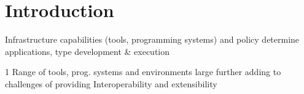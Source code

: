 \documentclass[conference,final]{IEEEtran}
\newcommand{\up}{\vspace*{-1em}}
\newcommand{\alnote}[1]{ {\textcolor{blue} { ***AL: #1 }}}
\newcommand{\jhanote}[1]{ {\textcolor{red} { ***SJ: #1 }}}
\newcommand{\alnote}[1]{}
\newcommand{\jhanote}[1]{}
\begin{document}













\section{Introduction}

Infrastructure capabilities (tools, programming systems) and policy
determine applications, type development \& execution

1 Range of tools, prog. systems and environments large further adding
to challenges of providing Interoperability and extensibility 
\end{document}
